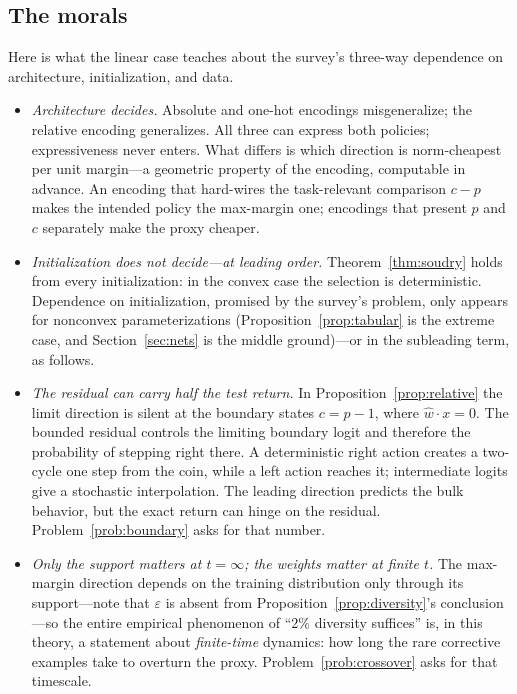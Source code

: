 \documentclass[11pt]{amsart}
\theoremstyle{plain}
\theoremstyle{definition}
\begin{document}
\subsection{The morals}\label{subsec:morals}
Here is what the linear case teaches about the survey's three-way dependence on architecture, initialization, and data.
\begin{itemize}
\item \emph{Architecture decides.} Absolute and one-hot encodings misgeneralize; the relative encoding generalizes. All three can express both policies; expressiveness never enters. What differs is which direction is norm-cheapest per unit margin---a geometric property of the encoding, computable in advance. An encoding that hard-wires the task-relevant comparison $c-p$ makes the intended policy the max-margin one; encodings that present $p$ and $c$ separately make the proxy cheaper.
\item \emph{Initialization does not decide---at leading order.} Theorem~\ref{thm:soudry} holds from every initialization: in the convex case the selection is deterministic. Dependence on initialization, promised by the survey's problem, only appears for nonconvex parameterizations (Proposition~\ref{prop:tabular} is the extreme case, and Section~\ref{sec:nets} is the middle ground)---or in the subleading term, as follows.
\item \emph{The residual can carry half the test return.} In Proposition~\ref{prop:relative} the limit direction is silent at the boundary states $c=p-1$, where $\hat w\cdot x=0$. The bounded residual controls the limiting boundary logit and therefore the probability of stepping right there. A deterministic right action creates a two-cycle one step from the coin, while a left action reaches it; intermediate logits give a stochastic interpolation. The leading direction predicts the bulk behavior, but the exact return can hinge on the residual. Problem~\ref{prob:boundary} asks for that number.
\item \emph{Only the support matters at $t=\infty$; the weights matter at finite $t$.} The max-margin direction depends on the training distribution only through its support---note that $\varepsilon$ is absent from Proposition~\ref{prop:diversity}'s conclusion---so the entire empirical phenomenon of ``$2\%$ diversity suffices'' \cite{langosco2022} is, in this theory, a statement about \emph{finite-time} dynamics: how long the rare corrective examples take to overturn the proxy. Problem~\ref{prob:crossover} asks for that timescale.
\end{itemize}
\end{document}
